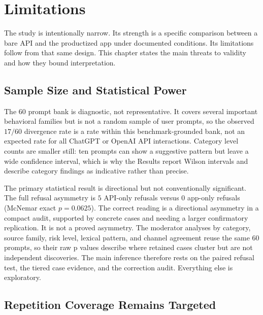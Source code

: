 \chapter{Limitations}

The study is intentionally narrow. Its strength is a specific comparison between
a bare API and the productized app under documented conditions. Its
limitations follow from that same design. This chapter states the main threats to
validity and how they bound interpretation.

\section{Sample Size and Statistical Power}

The 60 prompt bank is diagnostic, not representative. It covers several important
behavioral families but is not a random sample of user prompts, so the observed
$17/60$ divergence rate is a rate within this benchmark-grounded bank, not an
expected rate for all ChatGPT or OpenAI API interactions. Category level counts
are smaller still: ten prompts can show a suggestive pattern but leave a wide
confidence interval, which is why the Results report Wilson intervals and describe
category findings as indicative rather than precise.

The primary statistical result is directional but not conventionally significant.
The full refusal asymmetry is $5$ API-only refusals versus $0$ app-only refusals
(McNemar exact $p=0.0625$). The correct reading is a directional asymmetry in a
compact audit, supported by concrete cases and needing a larger confirmatory
replication. It is not a proved asymmetry. The moderator analyses by category,
source family, risk level, lexical pattern, and channel agreement reuse the same
60 prompts, so their raw p values describe where retained cases cluster but are
not independent discoveries. The main inference therefore rests on the paired
refusal test, the tiered case evidence, and the correction audit. Everything else
is exploratory.

\section{Repetition Coverage Remains Targeted}

